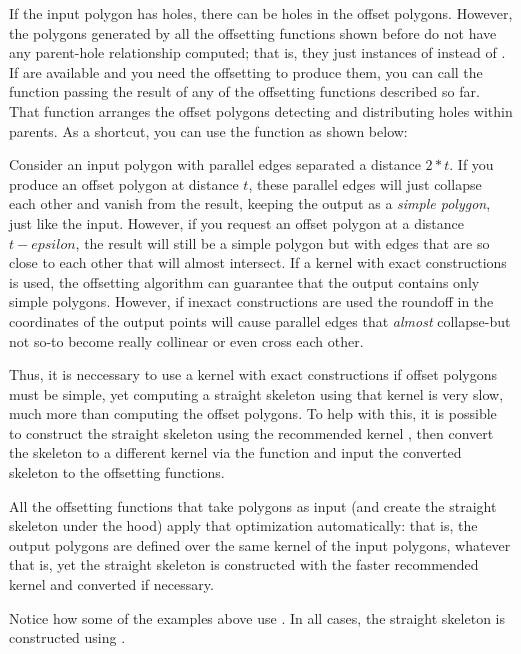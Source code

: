 
If the input polygon has holes, there can be holes in the offset polygons. 
However, the polygons generated by all the offsetting functions shown before
do not have any parent-hole relationship computed; that is, they just instances
of  instead of . 
If  are available and you need the offsetting to produce them, you can call the function  passing the result of any of the offsetting functions described so far. That function arranges the offset polygons detecting and distributing holes within parents.
As a shortcut, you can use the function  as shown below:


\begin{ccAdvanced}
Consider an input polygon with parallel edges separated a distance $2*t$. If you produce an offset polygon at distance $t$, these parallel edges  will just collapse each other and vanish from the result, keeping the output as a {\em simple polygon}, just like the input. However, if you request an offset polygon at a distance $t-epsilon$, the result will still be a simple polygon but with edges that are so close to each other that will almost intersect. 
If a kernel with exact constructions is used, the offsetting algorithm can guarantee that the output contains only simple polygons. However, if inexact constructions are used the roundoff in the coordinates of the output points will cause parallel edges that {\em almost} collapse-but not so-to become really collinear or even cross each other. 

Thus, it is neccessary to use a kernel with exact constructions if offset polygons must be simple, yet computing a straight skeleton using that kernel is very slow, much more than computing the offset polygons. To help with this, it is possible to construct the straight skeleton using the recommended kernel , then convert the skeleton to a different kernel via the function  and input the converted skeleton to the offsetting functions.

All the offsetting functions that take polygons as input (and create the straight skeleton under the hood) apply that optimization automatically: that is, the output polygons are defined over the same kernel of the input polygons, whatever that is, yet the straight skeleton is constructed with the faster recommended kernel and converted if necessary.

Notice how some of the examples above use . In all cases, the straight skeleton is constructed using .

\end{ccAdvanced}

